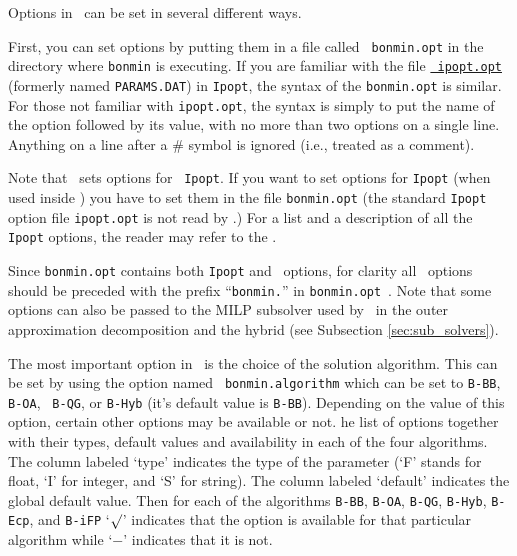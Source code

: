 
\begin{PageSummary}
\end{PageSummary}


Options in \Bonmin\ can be set in several different ways.

First, you can set options by putting them in a file called {\tt
bonmin.opt} in the directory where {\tt bonmin} is executing. If you
are familiar with the file
\href{\IpoptDoc{34}}{\tt
ipopt.opt} (formerly named {\tt PARAMS.DAT}) in {\tt Ipopt}, the
syntax of the {\tt bonmin.opt} is similar. For those not familiar
with {\tt ipopt.opt}, the syntax is simply to put the name of the
option followed by its value, with no more than two options on a
single line. Anything on a line after a \# symbol is ignored (i.e.,
treated as a comment).

Note that \Bonmin\ sets options for {\tt
Ipopt}. If you want to set options for {\tt Ipopt} (when used inside \Bonmin) you have to set them
in the file {\tt bonmin.opt} (the standard {\tt Ipopt} option file {\tt ipopt.opt}
is not read by \Bonmin.)
For a list and a description of all the {\tt Ipopt} options, the
reader may refer to the
.

Since {\tt bonmin.opt} contains both {\tt Ipopt} and \Bonmin\ options, for clarity
all \Bonmin\ options should be preceded with the prefix ``{\tt bonmin.}'' in {\tt bonmin.opt}~.
Note that some options can also be passed to the MILP subsolver used by \Bonmin\
in the outer approximation decomposition
and the hybrid (see Subsection \ref{sec:sub_solvers}).

The most important option in \Bonmin\ is the choice of the solution
algorithm. This can be set by using the option named {\tt
bonmin.algorithm} which can be set to {\tt B-BB}, {\tt B-OA}, {\tt
B-QG}, or {\tt B-Hyb} (it's default value is {\tt B-BB}). Depending
on the value of this option, certain other options may be available
or not. \latexhtml{Table \ref{tab:options} gives t}{T}he list of options together
with their types, default values and availability in each of the
four algorithms. The column labeled `type' indicates the type of the
parameter (`F' stands for float, `I' for integer, and `S' for
string). The column labeled `default' indicates the global default
value. Then for each of the algorithms {\tt B-BB}, {\tt B-OA},
{\tt B-QG}, {\tt B-Hyb}, {\tt B-Ecp}, and {\tt B-iFP} `$\surd$' indicates that the option is
available for that particular algorithm
while `$-$' indicates that it is not.

